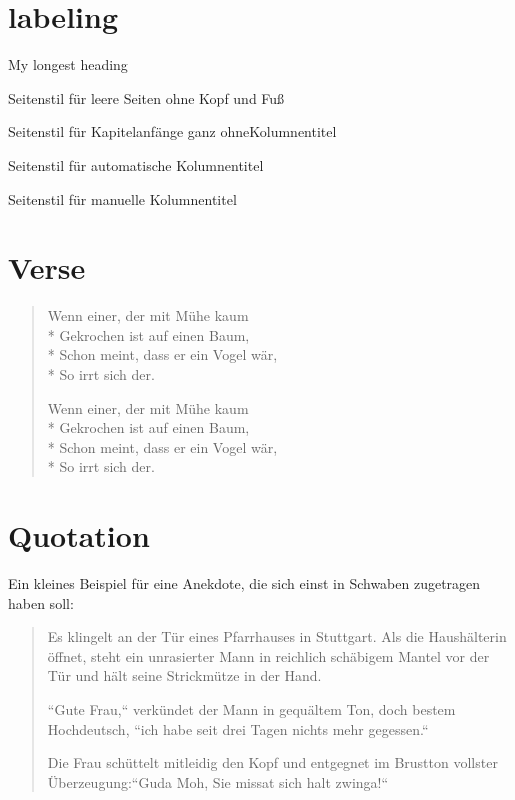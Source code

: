 \section{labeling}
\begin{labeling}[ ]{My longest heading}
	\item[empty]Seitenstil für leere Seiten ohne Kopf und Fuß
	\item[plain]Seitenstil für Kapitelanfänge ganz ohneKolumnentitel
	\item[headings]Seitenstil für automatische Kolumnentitel
	\item[my longest heading]Seitenstil für manuelle Kolumnentitel
\end{labeling}


\section{Verse}
\begin{verse}
	Wenn einer, der mit Mühe kaum\\*
	Gekrochen ist auf einen Baum,\\*
	Schon meint, dass er ein Vogel wär,\\*
	So irrt sich der.
    \par
	Wenn einer, der mit Mühe kaum\\*
	Gekrochen ist auf einen Baum,\\*
	Schon meint, dass er ein Vogel wär,\\*
	So irrt sich der.
	
\end{verse}

\section{Quotation}
	Ein kleines Beispiel für eine Anekdote, die sich einst in Schwaben zugetragen haben soll:
	\begin{quotation}
		Es klingelt an der Tür eines Pfarrhauses in Stuttgart. Als die Haushälterin öffnet, steht ein unrasierter Mann in reichlich schäbigem Mantel vor der Tür und hält seine Strickmütze in der Hand.
		
		``Gute Frau,`` verkündet der Mann in gequältem Ton, doch bestem Hochdeutsch, ``ich habe seit drei Tagen nichts mehr gegessen.``
		
		Die Frau schüttelt mitleidig den Kopf und entgegnet im Brustton vollster Überzeugung:``Guda Moh, Sie missat sich halt zwinga!``
	\end{quotation}


